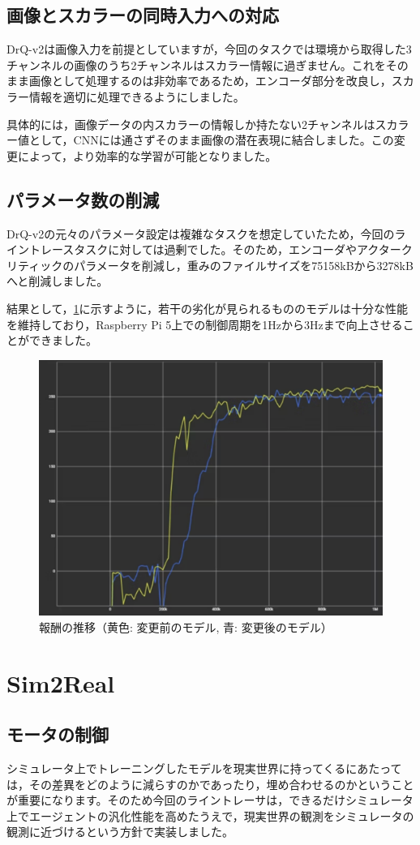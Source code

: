 \subsection{画像とスカラーの同時入力への対応}
DrQ-v2は画像入力を前提としていますが，今回のタスクでは環境から取得した3チャンネルの画像のうち2チャンネルはスカラー情報に過ぎません。これをそのまま画像として処理するのは非効率であるため，エンコーダ部分を改良し，スカラー情報を適切に処理できるようにしました。

具体的には，画像データの内スカラーの情報しか持たない2チャンネルはスカラー値として，CNNには通さずそのまま画像の潜在表現に結合しました。この変更によって，より効率的な学習が可能となりました。

\subsection{パラメータ数の削減}
DrQ-v2の元々のパラメータ設定は複雑なタスクを想定していたため，今回のライントレースタスクに対しては過剰でした。そのため，エンコーダやアクタークリティックのパラメータを削減し，重みのファイルサイズを75158kBから3278kBへと削減しました。

結果として，\ref{fig:image5}に示すように，若干の劣化が見られるもののモデルは十分な性能を維持しており，Raspberry Pi 5上での制御周期を1Hzから3Hzまで向上させることができました。
\begin{figure}[h]
  \centering
  \includegraphics[width=0.7\hsize]{line-tracer/fig/image5.png}
  \caption{報酬の推移（黄色: 変更前のモデル, 青: 変更後のモデル）}
  \label{fig:image5}
\end{figure}

\section{Sim2Real}

\subsection{モータの制御}
シミュレータ上でトレーニングしたモデルを現実世界に持ってくるにあたっては，その差異をどのように減らすのかであったり，埋め合わせるのかということが重要になります。そのため今回のライントレーサは，できるだけシミュレータ上でエージェントの汎化性能を高めたうえで，現実世界の観測をシミュレータの観測に近づけるという方針で実装しました。

